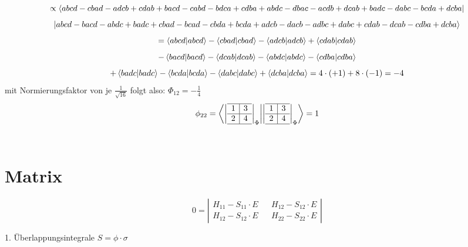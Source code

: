 \documentclass[12pt,a4paper]{article}
\begin{document}
\tiny 
$$ \propto \bra{abcd - cbad - adcb + cdab + bacd - cabd - bdca + cdba
+ abdc - dbac - acdb + dcab + badc - dabc - bcda + dcba}$$
$$ \ket{abcd - bacd - abdc + badc + cbad - bcad - cbda + bcda 
+adcb - dacb - adbc + dabc + cdab - dcab - cdba + dcba}$$
\normalsize
$$= \bra{abcd}\ket{abcd} - \bra{cbad}\ket{cbad} - \bra{adcb}\ket{adcb} + \bra{cdab}\ket{cdab} $$
$$ - \bra{bacd}\ket{bacd}  - \bra{dcab}\ket{dcab}
- \bra{abdc}\ket{abdc} -  \bra{cdba}\ket{cdba}  $$
$$+ \bra{badc}\ket{badc} - \bra{bcda}\ket{bcda} - \bra{dabc}\ket{dabc} + \bra{dcba}\ket{dcba} = 4\cdot (+1) + 8 \cdot (-1) = -4 $$ mit Normierungsfaktor von je $\frac{1}{\sqrt{16}}$ folgt also: $\Phi_{12} = - \frac{1}{4} $ \\




$$\phi_{22} = \bra{
\left|
  \begin{array}{c|c}
  \hline 
    1 & 3 \\ \hline 
    2 & 4 \\
    \hline 
  \end{array}
\right| _{\Phi}
} \ket{
\left|
  \begin{array}{c|c}
  \hline 
    1 & 3 \\ \hline 
    2 & 4 \\
    \hline 
  \end{array}
\right| _{\Phi}
} = 1 $$ \\




\newpage 
\section{Matrix}

$$ 0 = \left|
  \begin{array}{ccc}
  H_{11} - S_{11} \cdot E && H_{12} - S_{12}\cdot E \\
  H_{12} - S_{12}\cdot E && H_{22} - S_{22} \cdot E 
  \end{array}
  \right|
  $$
  
1. Überlappungsintegrale $S = \phi \cdot \sigma$ \\
\end{document}
